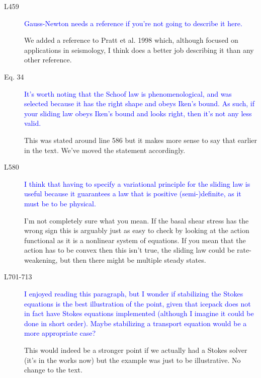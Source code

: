 \documentclass{article}
\theoremstyle{definition}
\theoremstyle{plain}
\begin{document}
\begin{description}
\item[L459] \textcolor{blue}{Gauss-Newton needs a reference if you're not going to describe it here.}

We added a reference to Pratt et al. 1998 which, although focused on applications in seismology, I think does a better job describing it than any other reference.

\item[Eq. 34] \textcolor{blue}{It's worth noting that the Schoof law is phenomenological, and was
selected because it has the right shape and obeys Iken's bound. As such,
if your sliding law obeys Iken's bound and looks right, then it's not any
less valid.}

This was stated around line 586 but it makes more sense to say that earlier in the text.
We've moved the statement accordingly.

\item[L580] \textcolor{blue}{I think that having to specify a variational principle for the sliding law
is useful because it guarantees a law that is positive (semi-)definite, as it
must be to be physical.}

I'm not completely sure what you mean.
If the basal shear stress has the wrong sign this is arguably just as easy to check by looking at the action functional as it is a nonlinear system of equations.
If you mean that the action has to be convex then this isn't true, the sliding law could be rate-weakening, but then there might be multiple steady states.

\item[L701-713] \textcolor{blue}{I enjoyed reading this paragraph, but I wonder if stabilizing the
Stokes equations is the best illustration of the point, given that icepack
does not in fact have Stokes equations implemented (although I imagine
it could be done in short order). Maybe stabilizing a transport equation
would be a more appropriate case?}

This would indeed be a stronger point if we actually had a Stokes solver (it's in the works now) but the example was just to be illustrative.
No change to the text.
\end{description}
\end{document}
